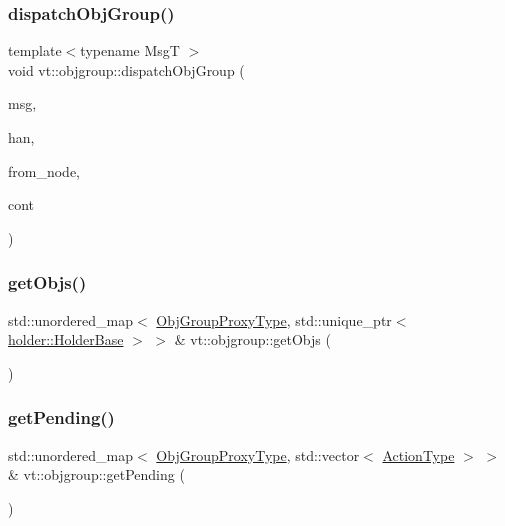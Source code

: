 \subsubsection{\texorpdfstring{dispatch\+Obj\+Group()}{dispatchObjGroup()}}
{\footnotesize\ttfamily template$<$typename MsgT $>$ \\
void vt\+::objgroup\+::dispatch\+Obj\+Group (\begin{DoxyParamCaption}\item[{\hyperlink{namespacevt_ab2b3d506ec8e8d1540aede826d84a239}{Msg\+Shared\+Ptr}$<$ MsgT $>$}]{msg,  }\item[{\hyperlink{namespacevt_af64846b57dfcaf104da3ef6967917573}{Handler\+Type}}]{han,  }\item[{\hyperlink{namespacevt_a866da9d0efc19c0a1ce79e9e492f47e2}{Node\+Type}}]{from\+\_\+node,  }\item[{\hyperlink{namespacevt_ae0a5a7b18cc99d7b732cb4d44f46b0f3}{Action\+Type}}]{cont }\end{DoxyParamCaption})}

\mbox{\label{namespacevt_1_1objgroup_a51307ccb565eb0441ba64949c67031cb}} 
\subsubsection{\texorpdfstring{get\+Objs()}{getObjs()}}
{\footnotesize\ttfamily std\+::unordered\+\_\+map$<$ \hyperlink{namespacevt_ad7cae989df485fccca57f0792a880a8e}{Obj\+Group\+Proxy\+Type}, std\+::unique\+\_\+ptr$<$ \hyperlink{structvt_1_1objgroup_1_1holder_1_1_holder_base}{holder\+::\+Holder\+Base} $>$ $>$ \& vt\+::objgroup\+::get\+Objs (\begin{DoxyParamCaption}{ }\end{DoxyParamCaption})}

\mbox{\label{namespacevt_1_1objgroup_a0574ec1b0319596b2f2af0a107108390}} 
\subsubsection{\texorpdfstring{get\+Pending()}{getPending()}}
{\footnotesize\ttfamily std\+::unordered\+\_\+map$<$ \hyperlink{namespacevt_ad7cae989df485fccca57f0792a880a8e}{Obj\+Group\+Proxy\+Type}, std\+::vector$<$ \hyperlink{namespacevt_ae0a5a7b18cc99d7b732cb4d44f46b0f3}{Action\+Type} $>$ $>$ \& vt\+::objgroup\+::get\+Pending (\begin{DoxyParamCaption}{ }\end{DoxyParamCaption})}

